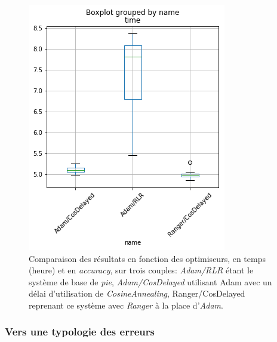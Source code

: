 \begin{figure}[ht]
\begin{minipage}[c]{0.55\linewidth}
        \includegraphics[width=1\linewidth]{results/lemmatisation/entrainement/boxplot_time_ranger.png}
    \end{minipage}
    \caption{Comparaison des résultats en fonction des optimiseurs, en temps (heure) et en \textit{accuracy}, sur trois couples: \textit{Adam/RLR} étant le système de base de \textit{pie}, \textit{Adam/CosDelayed} utilisant Adam avec un délai d'utilisation de \textit{CosineAnnealing}, Ranger/CosDelayed reprenant ce système avec \textit{Ranger} à la place d'\textit{Adam}. }
    \label{fig:lemmatisation:optimiseur:ranger}
\end{figure}

\subsubsection{Vers une typologie des erreurs}

